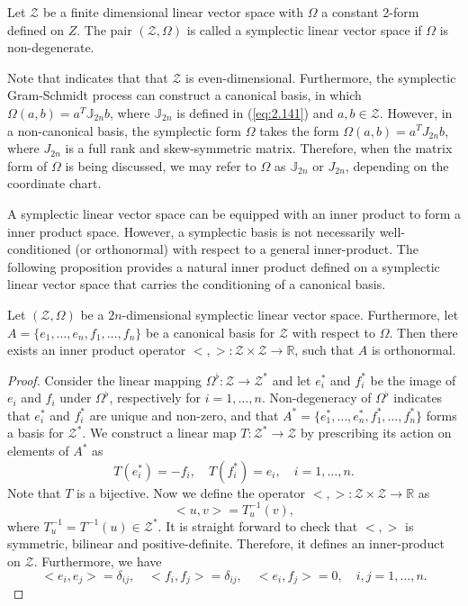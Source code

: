\begin{definition}
Let $\mathcal Z$ be a finite dimensional linear vector space with $\Omega$ a constant 2-form defined on $Z$. The pair $(\mathcal Z,\Omega)$ is called a symplectic linear vector space if $\Omega$ is non-degenerate.
\end{definition}
Note that  indicates that that $\mathcal Z$ is even-dimensional. Furthermore, the symplectic Gram-Schmidt process can construct a canonical basis, in which $\Omega(a,b) = a^T \mathbb J_{2n} b$, where $\mathbb J_{2n}$ is defined in (\ref{eq:2.141}) and $a,b\in \mathcal Z$. However, in a non-canonical basis, the symplectic form $\Omega$ takes the form $\Omega(a,b) = a^TJ_{2n}b$, where $J_{2n}$ is a full rank and skew-symmetric matrix. Therefore, when the matrix form of $\Omega$ is being discussed, we may refer to $\Omega$ as $\mathbb J_{2n}$ or $J_{2n}$, depending on the coordinate chart.

A symplectic linear vector space can be equipped with an inner product to form a inner product space. However, a symplectic basis is not necessarily well-conditioned (or orthonormal) with respect to a general inner-product. The following proposition provides a natural inner product defined on a symplectic linear vector space that carries the conditioning of a canonical basis.

\begin{proposition} \label{theorem:2.11}
Let $(\mathcal Z,\Omega)$ be a $2n$-dimensional symplectic linear vector space. Furthermore, let $A = \{ e_1,\dots,e_n,f_1,\dots,f_n \}$ be a canonical basis for $\mathcal Z$ with respect to $\Omega$. Then there exists an inner product operator $<,>:\mathcal Z\times \mathcal Z \to \mathbb R$, such that $A$ is orthonormal.
\end{proposition}

\begin{proof}
Consider the linear mapping $\Omega^{\flat}:\mathcal Z \to \mathcal Z^*$ and let $e_i^*$ and $f_i^*$ be the image of $e_i$ and $f_i$ under $\Omega^{\flat}$, respectively for $i=1,\dots,n$. Non-degeneracy of $\Omega^{\flat}$ indicates that $e_i^*$ and $f_i^*$ are unique and non-zero, and that $A^*=\{e_1^*,\dots,e_n^*,f_1^*,\dots,f_n^*\}$ forms a basis for $\mathcal Z^*$. We construct a linear map $T:\mathcal Z^* \to \mathcal Z$ by prescribing its action on elements of $A^*$ as
\begin{equation*}
	T(e_i^*) = -f_i, \quad T(f_i^*) = e_i, \quad i=1,\dots,n.
\end{equation*}
Note that $T$ is a bijective. Now we define the operator $<,>:\mathcal Z\times \mathcal Z \to \mathbb R$ as
\begin{equation*}
	<u,v> = T^{-1}_{u} (v),	
\end{equation*}
where $T^{-1}_{u} = T^{-1}(u) \in \mathcal Z^*$. It is straight forward to check that $<,>$ is symmetric, bilinear and positive-definite. Therefore, it defines an inner-product on $\mathcal Z$. Furthermore, we have
\begin{equation*}
	<e_i,e_j> = \delta_{ij},\quad <f_i,f_j> = \delta_{ij}, \quad <e_i,f_j> = 0, \quad i,j=1,\dots,n.
\end{equation*}
\end{proof}

